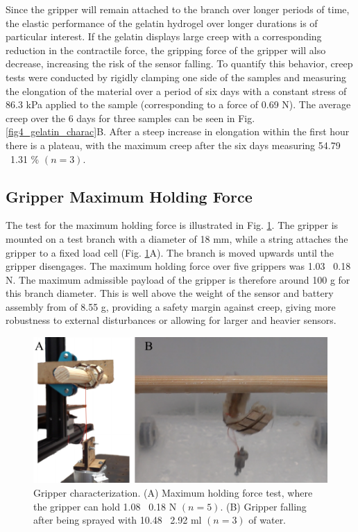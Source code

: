 
Since the gripper will remain attached to the branch over longer periods of time, the elastic performance of the gelatin hydrogel over longer durations is of particular interest. If the gelatin displays large creep with a corresponding reduction in the contractile force, the gripping force of the gripper will also decrease, increasing the risk of the sensor falling. To quantify this behavior, creep tests were conducted by rigidly clamping one side of the samples and measuring the elongation of the material over a period of six days with a constant stress of 86.3 kPa applied to the sample (corresponding to a force of 0.69 N). The average creep over the 6 days for three samples can be seen in Fig. \ref{fig4_gelatin_charac}B. After a steep increase in elongation  within the first hour there is a plateau, with the maximum creep after the six days measuring 54.79 \textpm~1.31 \% $(n=3)$.


\subsection{Gripper Maximum Holding Force}
The test for the maximum holding force is illustrated in Fig. \ref{fig6_gripper_characterization}. The gripper is mounted on a test branch with a diameter of 18 mm, while a string attaches the gripper to a fixed load cell (Fig. \ref{fig6_gripper_characterization}A). The branch is moved upwards until the gripper disengages. The maximum holding force over five grippers was 1.03 \textpm~0.18 N. The maximum admissible payload of the gripper is therefore around 100 g for this branch diameter. This is well above the weight of the sensor and battery assembly from \cite{Geckeler2022a} of 8.55 g, providing a safety margin against creep, giving more robustness to external disturbances or allowing for larger and heavier sensors.

\begin{figure}[!t]
\centering
\includegraphics[width=1\columnwidth]{chapters/papers/BOG/figures/figure6-gripper-charac/figure6-gripper-charac.pdf}
\caption{Gripper characterization. (A) Maximum holding force test, where the gripper can hold 1.08 \textpm~0.18 N $(n=5)$. (B) Gripper falling after being sprayed with 10.48 \textpm~2.92 ml $(n=3)$ of water.}
\label{fig6_gripper_characterization}
\end{figure}

